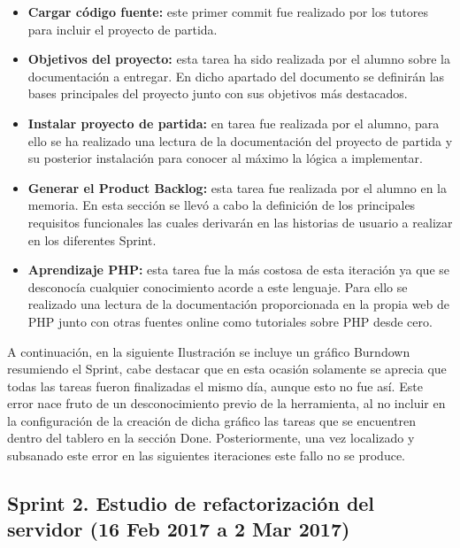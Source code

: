 \begin{itemize}

	\item \textbf{Cargar código fuente:} este primer commit fue realizado por los tutores para incluir el proyecto de partida.
	
	\item \textbf{Objetivos del proyecto:} esta tarea ha sido realizada por el alumno sobre la documentación a entregar. En dicho apartado del documento se definirán las bases principales del proyecto junto con sus objetivos más destacados.
	\item \textbf{Instalar proyecto de partida:} en tarea fue realizada por el alumno, para ello se ha realizado una lectura de la documentación del proyecto de partida y su posterior instalación para conocer al máximo la lógica a implementar.
	
	\item \textbf{Generar el Product Backlog:}  esta tarea fue realizada por el alumno en la memoria. En esta sección se llevó a cabo la definición de los principales requisitos funcionales las cuales derivarán en las historias de usuario a realizar en los diferentes Sprint.
	
	\item \textbf{Aprendizaje PHP:} esta tarea fue la más costosa de esta iteración ya que se desconocía cualquier conocimiento acorde a este lenguaje. Para ello se realizado una lectura de la documentación proporcionada en la propia web de PHP \cite{wiki:phpdoc} junto con otras fuentes online como tutoriales sobre PHP desde cero.

\end{itemize}


A continuación, en la siguiente Ilustración se incluye un gráfico Burndown resumiendo el Sprint, cabe destacar que en esta ocasión solamente se aprecia que todas las tareas fueron finalizadas el mismo día, aunque esto no fue así. Este error nace fruto de un desconocimiento previo de la herramienta, al no incluir en la configuración de la creación de dicha gráfico las tareas que se encuentren dentro del tablero en la sección Done. Posteriormente, una vez localizado y subsanado este error en las siguientes iteraciones este fallo no se produce.



\subsection{Sprint 2. Estudio de refactorización del servidor (16 Feb 2017 a 2 Mar 2017)}

